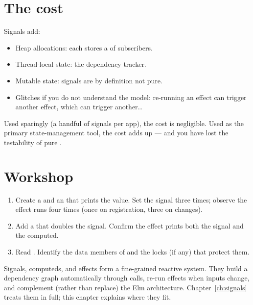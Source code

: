 \section{The cost}

Signals add:

\begin{itemize}[leftmargin=*]
  \item Heap allocations: each  stores a
     of subscribers.
  \item Thread-local state: the dependency tracker.
  \item Mutable state: signals are by definition not pure.
  \item Glitches if you do not understand the model: re-running
    an effect can trigger another effect, which can trigger
    another\ldots
\end{itemize}

Used sparingly (a handful of signals per app), the cost is
negligible. Used as the primary state-management tool, the cost
adds up --- and you have lost the testability of pure
.

\section*{Workshop}

\begin{enumerate}[leftmargin=*]
  \item Create a  and an  that
    prints the value. Set the signal three times; observe the
    effect runs four times (once on registration, three on
    changes).
  \item Add a  that doubles the signal. Confirm
    the effect prints both the signal and the computed.
  \item Read . Identify
    the data members of  and the locks (if any)
    that protect them.
\end{enumerate}

\begin{recap}
Signals, computeds, and effects form a fine-grained reactive
system. They build a dependency graph automatically through
 calls, re-run effects when inputs change, and
complement (rather than replace) the Elm architecture.
Chapter~\ref{ch:signals} treats them in full; this chapter
explains where they fit.
\end{recap}
